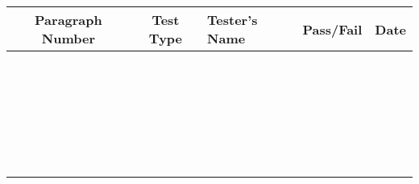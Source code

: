 

\begin{table}[h]
\centering
\begin{tabular}{|c|c|C{6cm}|c|c|}
\hline
\textbf{Paragraph Number} & \textbf{Test Type}& 
\textbf{Tester's Name} & \textbf{Pass/Fail} & \textbf{Date} \\
\hline
 & & & & \\
\hline
 & & & & \\
\hline
 & & & & \\
\hline
 & & & & \\
\hline
 & & & & \\
\hline
 & & & & \\
\hline
 & & & & \\
\hline
 & & & & \\
\hline
 & & & & \\
\hline
 & & & & \\
\hline
 & & & & \\
\hline
 & & & & \\
\hline
 & & & & \\
\hline
 & & & & \\
\hline
 & & & & \\
\hline
 & & & & \\
\hline
 & & & & \\
\hline
 & & & & \\
\hline
 & & & & \\
\hline
 & & & & \\
\hline
 & & & & \\
\hline
 & & & & \\
\hline
 & & & & \\
\hline
 & & & & \\
\hline
 & & & & \\
\hline
 & & & & \\
\hline
\end{tabular}
\end{table}
